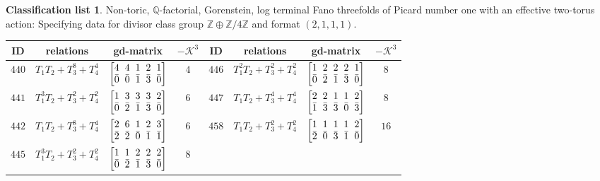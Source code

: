 \documentclass[10pt,a4paper]{amsart}
\theoremstyle{definition}
\newtheorem{class-list}[thm]{Classification list}
\def\ZZ{{\mathbb Z}}
\def\QQ{{\mathbb Q}}
\numberwithin{equation}{section}
\begin{document}
\begin{class-list}
Non-toric, $\QQ$-factorial, Gorenstein, log terminal Fano
threefolds of Picard number one with an effective two-torus action:
Specifying data for divisor class group $\ZZ\oplus \ZZ/4\ZZ$ and
format $(2,1,1,1)$.
\begin{table}[h!]\centering\setlength{\tabcolsep}{3.5pt}
\renewcommand{\arraystretch}{1.15}\small\tabulinesep=1mm
\begin{tabu}{c|c|c|c||c|c|c|c}
\hline
ID&relations&gd-matrix&$-\mathcal{K}^3$&ID&relations&gd-matrix&$-\mathcal{K}^3$
\\
\hline
${440}$&${T_{1}T_{2}+T_{3}^{8}+T_{4}^{4}}$
&$\arraycolsep=1mm\begin{bmatrix}{4} & {4} & {1} & {2} & {1} \\ {\bar{0}} & {\bar{0}} & {\bar{1}} & {\bar{3}} & {\bar{0}}\end{bmatrix}$&${4}$
&${446}$&${T_{1}^{2}T_{2}+T_{3}^{2}+T_{4}^{2}}$
&$\arraycolsep=1mm\begin{bmatrix}{1} & {2} & {2} & {2} & {1} \\ {\bar{0}} & {\bar{2}} & {\bar{1}} & {\bar{3}} & {\bar{0}}\end{bmatrix}$&${8}$
\\
\hline
${441}$&${T_{1}^{3}T_{2}+T_{3}^{2}+T_{4}^{2}}$
&$\arraycolsep=1mm\begin{bmatrix}{1} & {3} & {3} & {3} & {2} \\ {\bar{0}} & {\bar{2}} & {\bar{1}} & {\bar{3}} & {\bar{0}}\end{bmatrix}$&${6}$
&${447}$&${T_{1}T_{2}+T_{3}^{4}+T_{4}^{4}}$
&$\arraycolsep=1mm\begin{bmatrix}{2} & {2} & {1} & {1} & {2} \\ {\bar{1}} & {\bar{3}} & {\bar{3}} & {\bar{0}} & {\bar{3}}\end{bmatrix}$&${8}$
\\
\hline
${442}$&${T_{1}T_{2}+T_{3}^{8}+T_{4}^{4}}$
&$\arraycolsep=1mm\begin{bmatrix}{2} & {6} & {1} & {2} & {3} \\ {\bar{2}} & {\bar{2}} & {\bar{0}} & {\bar{1}} & {\bar{1}}\end{bmatrix}$&${6}$
&${458}$&${T_{1}T_{2}+T_{3}^{2}+T_{4}^{2}}$
&$\arraycolsep=1mm\begin{bmatrix}{1} & {1} & {1} & {1} & {2} \\ {\bar{2}} & {\bar{0}} & {\bar{3}} & {\bar{1}} & {\bar{0}}\end{bmatrix}$&${16}$
\\
\hline
${445}$&${T_{1}^{3}T_{2}+T_{3}^{2}+T_{4}^{2}}$
&$\arraycolsep=1mm\begin{bmatrix}{1} & {1} & {2} & {2} & {2} \\ {\bar{0}} & {\bar{2}} & {\bar{1}} & {\bar{3}} & {\bar{0}}\end{bmatrix}$&${8}$
\\
\end{tabu}%
\end{table}
\end{class-list}
\end{document}
